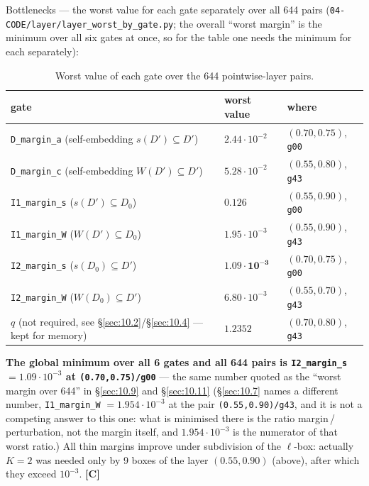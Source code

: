 Bottlenecks --- the worst value for each gate separately over all 644 pairs
(\texttt{04-\allowbreak CODE/\allowbreak layer/\allowbreak layer\_\allowbreak worst\_\allowbreak by\_\allowbreak gate.py}; the overall ``worst margin'' is the
minimum over all six gates at once, so for the table one needs the minimum
for each separately):

\begin{table}[ht]
\centering
\caption{Worst value of each gate over the 644 pointwise-layer pairs.}
\label{tab:worst-by-gate}
{\small\setlength{\tabcolsep}{4pt}
\begin{tabular}{>{\raggedright\arraybackslash}p{}ll}
\hline
gate & worst value & where \\
\hline
\texttt{D\_margin\_a} (self-embedding $s(D')\subseteq D'$) & $2.44 \cdot 10^{-2}$ & $(0.70,0.75)$, \texttt{g00} \\
\texttt{D\_margin\_c} (self-embedding $W(D')\subseteq D'$) & $5.28 \cdot 10^{-2}$ & $(0.55,0.80)$, \texttt{g43} \\
\texttt{I1\_margin\_s} ($s(D')\subseteq D_{0}$) & $0.126$ & $(0.55,0.90)$, \texttt{g00} \\
\texttt{I1\_margin\_W} ($W(D')\subseteq D_{0}$) & $1.95 \cdot 10^{-3}$ & $(0.55,0.90)$, \texttt{g43} \\
\texttt{I2\_margin\_s} ($s(D_{0})\subseteq D'$) & $\mathbf{1.09 \cdot 10^{-3}}$ & $(0.70,0.75)$, \texttt{g00} \\
\texttt{I2\_margin\_W} ($W(D_{0})\subseteq D'$) & $6.80 \cdot 10^{-3}$ & $(0.55,0.70)$, \texttt{g43} \\
$q$ (not required, see \S\ref{sec:10.2}/\S\ref{sec:10.4} --- kept for memory) & $1.2352$ & $(0.70,0.80)$, \texttt{g43} \\
\hline
\end{tabular}}
\end{table}
\FloatBarrier

\textbf{The global minimum over all 6 gates and all 644 pairs is \texttt{I2\_margin\_s} $= 1.09\cdot 10^{-3}$ at \texttt{(0.70,0.75)/\allowbreak g00}} --- the same number quoted as the ``worst
margin over 644'' in \S\ref{sec:10.9} and \S\ref{sec:10.11}
(\S\ref{sec:10.7} names a different number, \texttt{I1\_margin\_W} $= 1.954\cdot 10^{-3}$ at the
pair \texttt{(0.55,0.90)/\allowbreak g43}, and it is not a competing answer to this one: what is
minimised there is the ratio margin\,/\,perturbation, not the margin itself, and
$1.954\cdot 10^{-3}$ is the numerator of that worst ratio.) All thin margins improve under subdivision of the
$\ell$-box: actually $K=2$ was needed only by 9 boxes of the layer $(0.55,0.90)$
(above), after which they exceed $10^{-3}$. \textbf{[C]}

